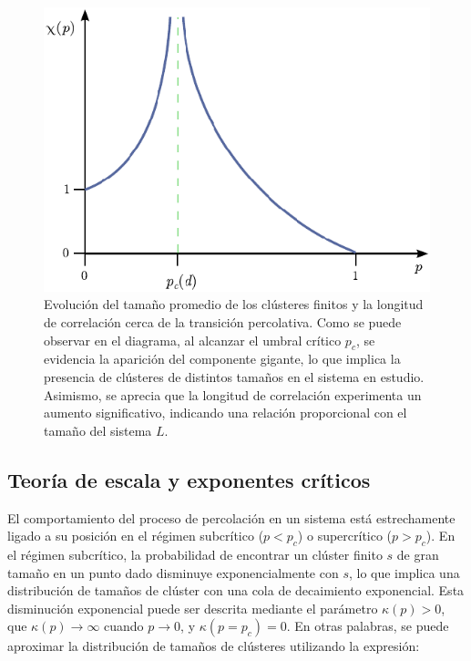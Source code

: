 \begin{figure}[ht]
	\centering\includegraphics[width=\imsize]{promedio.png}
	\caption[Evolución del tamaño promedio de los clústeres finitos y la longitud de correlación cerca de la transición percolativa.]{ Evolución del tamaño promedio de los clústeres finitos y la longitud de correlación cerca de la transición percolativa. Como se puede observar en el diagrama, al alcanzar el umbral crítico $p_c$, se evidencia la aparición del componente gigante, lo que implica la presencia de clústeres de distintos tamaños en el sistema en estudio. Asimismo, se aprecia que la longitud de correlación experimenta un aumento significativo, indicando una relación proporcional con el tamaño del sistema $L$.}\label{fig:promedio}
\end{figure}


\subsection{Teoría de escala y exponentes críticos}



El comportamiento del proceso de percolación en un sistema está estrechamente ligado a su posición en el régimen subcrítico ($p < p_c$) o supercrítico ($p > p_c$). En el régimen subcrítico, la probabilidad de encontrar un clúster finito $s$ de gran tamaño en un punto dado disminuye exponencialmente con $s$, lo que implica una distribución de tamaños de clúster con una cola de decaimiento exponencial. Esta disminución exponencial puede ser descrita mediante el parámetro $\kappa(p) > 0$, que $\kappa(p) \to\infty$ cuando $p\to0$, y $\kappa(p = p_c ) = 0$. En otras palabras, se puede aproximar la distribución de tamaños de clústeres utilizando la expresión:

